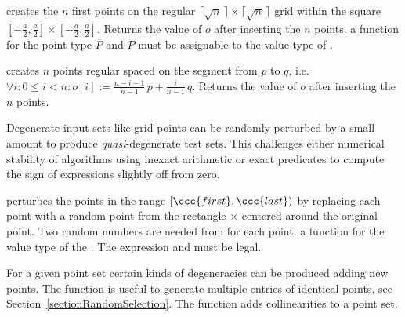 { creates the $n$ first points on the regular $\lceil\sqrt{n}\,\rceil
    \times \lceil  \sqrt{n}\,\rceil$ grid within the square
  $[-\frac{a}{2},\frac{a}{2}]\times [-\frac{a}{2},\frac{a}{2}]$.
  Returns the value of $o$ after inserting the $n$ points.
  \ccPrecond a function  for the point type
  $P$ and $P$ must be assignable to the value type of 
  .} 

{ creates $n$ points regular spaced on the segment from $p$ to $q$,
    i.e.~$\forall i: 0 \le i < n: o[i] := \frac{n-i-1}{n-1}\, p +
    \frac{i}{n-1}\, q$. Returns the value of $o$ after inserting
    the $n$ points.}


Degenerate input sets like grid points can be randomly perturbed by a
small amount to produce {\em quasi}-degenerate test sets. This
challenges either numerical stability of algorithms using inexact
arithmetic or exact predicates to compute the sign of expressions
slightly off from zero. 

{ perturbes the points in the range $[\ccc{first},\ccc{last})$ by
  replacing each point with a random point from the rectangle
   $\times$  centered around the original point.
  Two random numbers are needed from  for each point.
  \ccPrecond a function  for the value type of
    the . 
    The expression  and
     must be legal. 
}


For a given point set certain kinds of degeneracies can be produced
adding new points. The  function is
useful to generate multiple entries of identical points, see
Section~\ref{sectionRandomSelection}. The
 function adds collinearities to
a point set.



